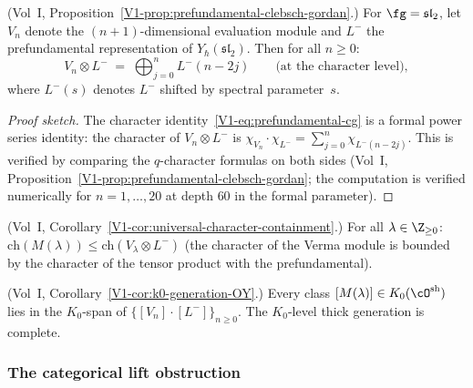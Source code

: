 \begin{proposition}
\textup{(Vol~I, Proposition~\ref*{V1-prop:prefundamental-clebsch-gordan}.)}
For $\fg=\mathfrak{sl}_2$, let $V_n$ denote the
$(n+1)$-dimensional evaluation module and $L^-$ the
prefundamental representation of
$Y_\hbar(\mathfrak{sl}_2)$. Then for all $n\ge 0$:
\begin{equation}
V_n\otimes L^-
\;=\;
\bigoplus_{j=0}^{n}L^-(n-2j)
\qquad
\text{(at the character level)},
\end{equation}
where $L^-(s)$ denotes $L^-$ shifted by spectral
parameter~$s$.
\end{proposition}

\begin{proof}[Proof sketch]
The character identity~\eqref{V1-eq:prefundamental-cg} is a
formal power series identity: the character of $V_n\otimes L^-$
is $\chi_{V_n}\cdot\chi_{L^-}=\sum_{j=0}^n\chi_{L^-(n-2j)}$.
This is verified by comparing the $q$-character formulas
on both sides (Vol~I, Proposition~\ref*{V1-prop:prefundamental-clebsch-gordan}; the computation is verified numerically
for $n=1,\ldots,20$ at depth $60$ in the formal parameter).
\end{proof}

\begin{corollary}
\textup{(Vol~I, Corollary~\ref*{V1-cor:universal-character-containment}.)}
For all $\lambda\in\Z_{\ge 0}$:
$\mathrm{ch}(M(\lambda))\le\mathrm{ch}(V_\lambda\otimes L^-)$
(the character of the Verma module is bounded by the character
of the tensor product with the prefundamental).
\end{corollary}

\begin{corollary}
\textup{(Vol~I, Corollary~\ref*{V1-cor:k0-generation-OY}.)}
Every class $[M(\lambda)]\in K_0(\cO^{\mathrm{sh}})$ lies
in the $K_0$-span of $\{[V_n]\cdot[L^-]\}_{n\ge 0}$.
The $K_0$-level thick generation is complete.
\end{corollary}

\subsubsection{The categorical lift obstruction}

